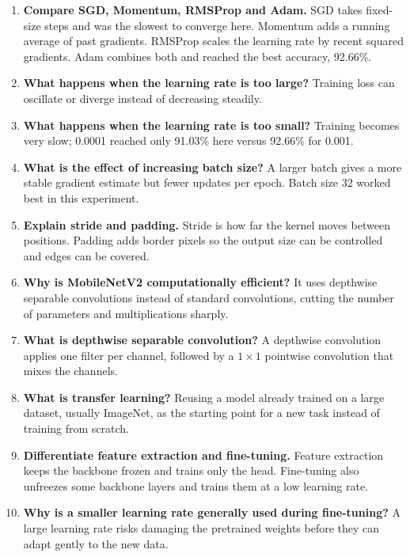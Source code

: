 \documentclass[10pt]{article}
\begin{document}
\begin{enumerate}
\item \textbf{Compare SGD, Momentum, RMSProp and Adam.}
SGD takes fixed-size steps and was the slowest to converge here. Momentum adds a running
average of past gradients. RMSProp scales the learning rate by recent squared gradients. Adam
combines both and reached the best accuracy, 92.66\%.

\item \textbf{What happens when the learning rate is too large?}
Training loss can oscillate or diverge instead of decreasing steadily.

\item \textbf{What happens when the learning rate is too small?}
Training becomes very slow; 0.0001 reached only 91.03\% here versus 92.66\% for 0.001.

\item \textbf{What is the effect of increasing batch size?}
A larger batch gives a more stable gradient estimate but fewer updates per epoch. Batch size
32 worked best in this experiment.

\item \textbf{Explain stride and padding.}
Stride is how far the kernel moves between positions. Padding adds border pixels so the output
size can be controlled and edges can be covered.

\item \textbf{Why is MobileNetV2 computationally efficient?}
It uses depthwise separable convolutions instead of standard convolutions, cutting the number
of parameters and multiplications sharply.

\item \textbf{What is depthwise separable convolution?}
A depthwise convolution applies one filter per channel, followed by a $1\times1$ pointwise
convolution that mixes the channels.

\item \textbf{What is transfer learning?}
Reusing a model already trained on a large dataset, usually ImageNet, as the starting point
for a new task instead of training from scratch.

\item \textbf{Differentiate feature extraction and fine-tuning.}
Feature extraction keeps the backbone frozen and trains only the head. Fine-tuning also
unfreezes some backbone layers and trains them at a low learning rate.

\item \textbf{Why is a smaller learning rate generally used during fine-tuning?}
A large learning rate risks damaging the pretrained weights before they can adapt gently to
the new data.


\end{enumerate}
\end{document}
